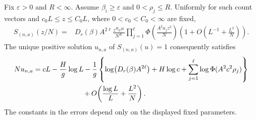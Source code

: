 \begin{theorem}
\label{thm:simplex-boundary-crossover}
Fix $\varepsilon>0$ and $R<\infty$. Assume $\beta_i\ge\varepsilon$
and $0<\rho_j\le R$. Uniformly for such count vectors and
$c_0L\le z\le C_0L$, where $0<c_0<C_0<\infty$ are fixed,
\begin{align}
S_{(n,a)}(z/N)
={}&D_r(\beta)A^{2\ell}\frac{z^H e^{gz}}{N^K}
\prod_{j=1}^\ell\Phi\!\left(\frac{A^2a_jz^2}{N}\right)
\left(1+O\!\left(L^{-1}+\frac{L^2}{N}\right)\right).
\label{eq:simplex-boundary-profile}
\end{align}
The unique positive solution $u_{n,a}$ of $S_{(n,a)}(u)=1$ consequently
satisfies
\begin{align}
Nu_{n,a}
={}&cL-\frac Hg\log L
-\frac1g\left\{
\log\bigl(D_r(\beta)A^{2\ell}\bigr)+H\log c
+\sum_{j=1}^\ell\log\Phi(A^2c^2\rho_j)\right\}
\notag\\
&\hspace{20mm}+O\!\left(\frac{\log L}{L}+\frac{L^2}{N}\right).
\label{eq:simplex-boundary-root}
\end{align}
The constants in the errors depend only on the displayed fixed parameters.
\end{theorem}

